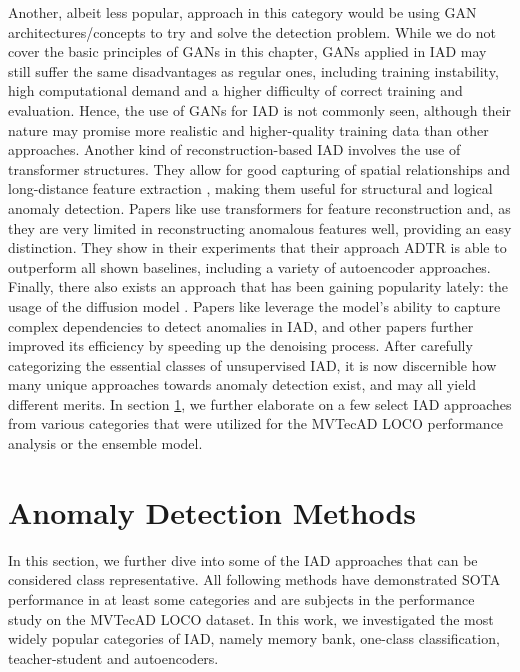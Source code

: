 Another, albeit less popular, approach in this category would be using GAN architectures/concepts to try and solve the detection problem. While we do not cover the basic principles of GANs in 
this chapter, GANs applied in IAD may still suffer the same disadvantages as regular ones, including training instability, high computational demand and a higher difficulty of correct training and 
evaluation. Hence, the use of GANs for IAD is not commonly seen, although their nature may promise more realistic and higher-quality training data than other approaches.
Another kind of reconstruction-based IAD involves the use of transformer structures. They allow for good capturing of spatial relationships and long-distance feature extraction \cite{xie2020benchmarking},
making them useful for structural and logical anomaly detection. Papers like \cite{You_2023transformer} use transformers for feature reconstruction and, as they are very 
limited in reconstructing anomalous features well, providing an easy distinction. They show in their experiments that their approach ADTR is able to outperform all shown baselines, including 
a variety of autoencoder approaches.
Finally, there also exists an approach that has been gaining popularity lately: the usage of the diffusion model \cite{ho2020denoisingdiffusionOG}. Papers like \cite{Wyatt_2022diffusionfirstapproach} 
leverage the model's ability to capture complex dependencies to detect anomalies in IAD, and other papers \cite{zhang2023diffusionaddiffusionmodern} further improved its efficiency by speeding up 
the denoising process.
\newline
After carefully categorizing the essential classes of unsupervised IAD, it is now discernible how many unique approaches towards anomaly detection exist, and may all yield different merits. 
In section \ref{sec:IADmethods}, we further elaborate on a few select IAD approaches from various categories that were utilized for the MVTecAD LOCO performance analysis or the ensemble 
model. 


\section{Anomaly Detection Methods}
\label{sec:IADmethods}
In this section, we further dive into some of the IAD approaches that can be considered class representative. All following methods have demonstrated SOTA performance in 
at least some categories and are subjects in the performance study on the MVTecAD LOCO dataset. In this work, we investigated the most widely popular categories of 
IAD, namely memory bank, one-class classification, teacher-student and autoencoders.

